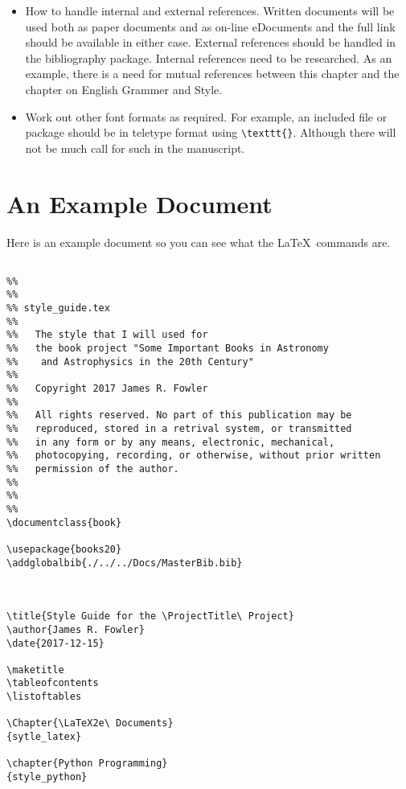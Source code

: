 \begin{itemize}

\item How to handle internal and external references.  Written
  documents will be used both as paper documents and as on-line
  eDocuments and the full link should be available in either
  case. External references should be handled in the bibliography
  package. Internal references need to be researched.  As an example,
  there is a need for mutual references between this chapter and the
  chapter on English Grammer and Style.

\item Work out other font formats as required. For example, an included
  file or package should be in teletype format using \verb|\texttt{}|.
  Although there will not be much call for such in the manuscript.

\end{itemize}

\section{An Example Document}

Here is an example document so you can see what the \LaTeX\ commands are.

\begin{verbatim}

%%
%%
%% style_guide.tex
%%
%%   The style that I will used for 
%%   the book project "Some Important Books in Astronomy
%%    and Astrophysics in the 20th Century"
%%
%%   Copyright 2017 James R. Fowler
%%
%%   All rights reserved. No part of this publication may be
%%   reproduced, stored in a retrival system, or transmitted
%%   in any form or by any means, electronic, mechanical,
%%   photocopying, recording, or otherwise, without prior written
%%   permission of the author.
%%
%%
%%
\documentclass{book}

\usepackage{books20}
\addglobalbib{./../../Docs/MasterBib.bib}



\title{Style Guide for the \ProjectTitle\ Project}
\author{James R. Fowler}
\date{2017-12-15}

\maketitle
\tableofcontents
\listoftables 

\Chapter{\LaTeX2e\ Documents}
{sytle_latex}

\chapter{Python Programming}
{style_python}


\end{verbatim}

